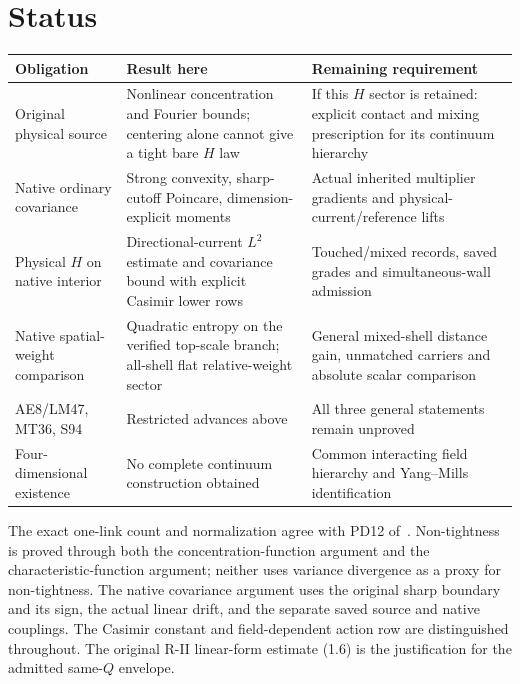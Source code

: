 \documentclass[11pt,letterpaper]{article}
\numberwithin{equation}{section}
\theoremstyle{plain}
\theoremstyle{remark}
\begin{document}
\section{Status}

\begin{center}
\small
\begin{tabularx}{\textwidth}{@{}p{}XX@{}}
\toprule
Obligation & Result here & Remaining requirement\\
\midrule
Original physical source & Nonlinear concentration and Fourier bounds;
centering alone cannot give a tight bare $H$ law & If this $H$ sector is retained:
explicit contact and mixing prescription for its continuum hierarchy\\[4pt]
Native ordinary covariance & Strong convexity, sharp-cutoff Poincare,
dimension-explicit moments & Actual inherited multiplier gradients and
physical-current/reference lifts\\[4pt]
Physical $H$ on native interior & Directional-current $L^2$ estimate and
covariance bound with explicit Casimir lower rows & Touched/mixed records,
saved grades and simultaneous-wall admission\\[4pt]
Native spatial-weight comparison & Quadratic entropy on the verified
top-scale branch; all-shell flat relative-weight sector & General mixed-shell
distance gain, unmatched carriers and absolute scalar comparison\\[4pt]
AE8/LM47, MT36, S94 & Restricted advances above & All three general
statements remain unproved\\[4pt]
Four-dimensional existence & No complete continuum construction obtained &
Common interacting field hierarchy and Yang--Mills identification\\
\bottomrule
\end{tabularx}
\end{center}

The exact one-link count and normalization agree with PD12
of~\cite[pp.~1182--1194]{W}. Non-tightness is proved through both
the concentration-function argument and the characteristic-function argument;
neither uses variance divergence as a proxy for non-tightness. The native
covariance argument uses the original sharp boundary and its sign,
the actual linear drift, and the separate saved source and native couplings.
The Casimir constant and field-dependent action row are distinguished
throughout. The original R-II linear-form estimate (1.6) is
the justification for the admitted same-$Q$ envelope.
\end{document}
